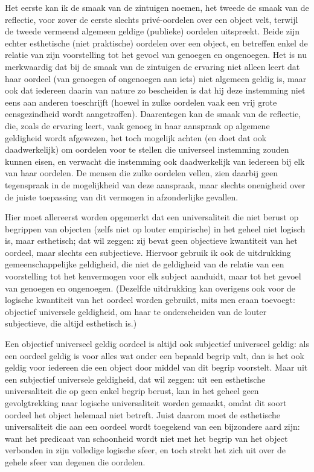 Het eerste kan ik de smaak van de zintuigen noemen, het tweede de smaak van de reflectie, voor zover de eerste slechts privé-oordelen over een object velt, terwijl de tweede vermeend algemeen geldige (publieke) oordelen uitspreekt. Beide zijn echter esthetische (niet praktische) oordelen over een object, en betreffen enkel de relatie van zijn voorstelling tot het gevoel van genoegen en ongenoegen. Het is nu merkwaardig dat bij de smaak van de zintuigen de ervaring niet alleen leert dat haar oordeel (van genoegen of ongenoegen aan iets) niet algemeen geldig is, maar ook dat iedereen daarin van nature zo bescheiden is dat hij deze instemming niet eens aan anderen toeschrijft (hoewel in zulke oordelen vaak een vrij grote eensgezindheid wordt aangetroffen). Daarentegen kan de smaak van de reflectie, die, zoals de ervaring leert, vaak genoeg in haar aanspraak op algemene geldigheid wordt afgewezen, het toch mogelijk achten (en doet dat ook daadwerkelijk) om oordelen voor te stellen die universeel instemming zouden kunnen eisen, en verwacht die instemming ook daadwerkelijk van iedereen bij elk van haar oordelen. De mensen die zulke oordelen vellen, zien daarbij geen tegenspraak in de mogelijkheid van deze aanspraak, maar slechts onenigheid over de juiste toepassing van dit vermogen in afzonderlijke gevallen.

Hier moet allereerst worden opgemerkt dat een universaliteit die niet berust op begrippen van objecten (zelfs niet op louter empirische) in het geheel niet logisch is, maar esthetisch; dat wil zeggen: zij bevat geen objectieve kwantiteit van het oordeel, maar slechts een subjectieve. Hiervoor gebruik ik ook de uitdrukking gemeenschappelijke geldigheid, die niet de geldigheid van de relatie van een voorstelling tot het kenvermogen voor elk subject aanduidt, maar tot het gevoel van genoegen en ongenoegen. (Dezelfde uitdrukking kan overigens ook voor de logische kwantiteit van het oordeel worden gebruikt, mits men eraan toevoegt: objectief universele geldigheid, om haar te onderscheiden van de louter subjectieve, die altijd esthetisch is.)

Een objectief universeel geldig oordeel is altijd ook subjectief universeel geldig: als een oordeel geldig is voor alles wat onder een bepaald begrip valt, dan is het ook geldig voor iedereen die een object door middel van dit begrip voorstelt. Maar uit een subjectief universele geldigheid, dat wil zeggen: uit een esthetische universaliteit die op geen enkel begrip berust, kan in het geheel geen gevolgtrekking naar logische universaliteit worden gemaakt, omdat dit soort oordeel het object helemaal niet betreft. Juist daarom moet de esthetische universaliteit die aan een oordeel wordt toegekend van een bijzondere aard zijn: want het predicaat van schoonheid wordt niet met het begrip van het object verbonden in zijn volledige logische sfeer, en toch strekt het zich uit over de gehele sfeer van degenen die oordelen.

